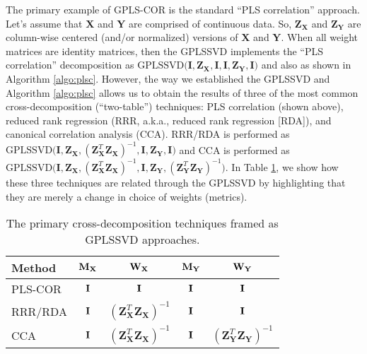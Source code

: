 \documentclass[12pt]{article}
\begin{document}
The primary example of GPLS-COR is the standard ``PLS correlation''
approach. Let's assume that \({\mathbf X}\) and \({\mathbf Y}\) are
comprised of continuous data. So, \({\mathbf Z}_{\mathbf X}\) and
\({\mathbf Z}_{\mathbf Y}\) are column-wise centered (and/or normalized)
versions of \({\mathbf X}\) and \({\mathbf Y}\). When all weight
matrices are identity matrices, then the GPLSSVD implements the ``PLS
correlation'' decomposition as
\(\mathrm{GPLSSVD(} {\mathbf I}, {\mathbf Z}_{\mathbf X}, {\mathbf I}, {\mathbf I}, {\mathbf Z}_{\mathbf Y}, {\mathbf I} \mathrm{)}\)
and also as shown in Algorithm \ref{algo:plsc}. However, the way we
established the GPLSSVD and Algorithm \ref{algo:plsc} allows us to
obtain the results of three of the most common cross-decomposition
(``two-table'') techniques: PLS correlation (shown above), reduced rank
regression (RRR, a.k.a., reduced rank regression {[}RDA{]}), and
canonical correlation analysis (CCA). RRR/RDA is performed as
\(\mathrm{GPLSSVD(} {\mathbf I}, {\mathbf Z}_{{\mathbf X}}, ({\mathbf Z}_{\mathbf X}^{T}{\mathbf Z}_{\mathbf X})^{-1}, {\mathbf I}, {\mathbf Z}_{{\mathbf Y}}, {\mathbf I}\mathrm{)}\)
and CCA is performed as
\(\mathrm{GPLSSVD(} {\mathbf I}, {\mathbf Z}_{{\mathbf X}}, ({\mathbf Z}_{\mathbf X}^{T}{\mathbf Z}_{\mathbf X})^{-1}, {\mathbf I}, {\mathbf Z}_{{\mathbf Y}}, ({\mathbf Z}_{\mathbf Y}^{T}{\mathbf Z}_{\mathbf Y})^{-1}\mathrm{)}\).
In Table \ref{table:crossdecomp}, we show how these three techniques are
related through the GPLSSVD by highlighting that they are merely a
change in choice of weights (metrics).

\begin{table}
\centering
\begin{tabular}{ l  c  c  c  c }
  Method & ${\bf M}_{\bf X}$ & ${\bf W}_{\bf X}$ & ${\bf M}_{\bf Y}$ & ${\bf W}_{\bf Y}$ \\
  \hline            
  PLS-COR & ${\bf I}$ & ${\bf I}$ & ${\bf I}$ & ${\bf I}$ \\
  RRR/RDA & ${\bf I}$ & $({\mathbf Z}_{\mathbf X}^{T}{\mathbf Z}_{\mathbf X})^{-1}$ & ${\bf I}$ & ${\bf I}$ \\
  CCA & ${\bf I}$ & $({\mathbf Z}_{\mathbf X}^{T}{\mathbf Z}_{\mathbf X})^{-1}$ & ${\bf I}$ & $({\mathbf Z}_{\mathbf Y}^{T}{\mathbf Z}_{\mathbf Y})^{-1}$ \\
  \hline  
\end{tabular}
\caption{The primary cross-decomposition techniques framed as GPLSSVD approaches.}\label{table:crossdecomp}
\end{table}
\end{document}
